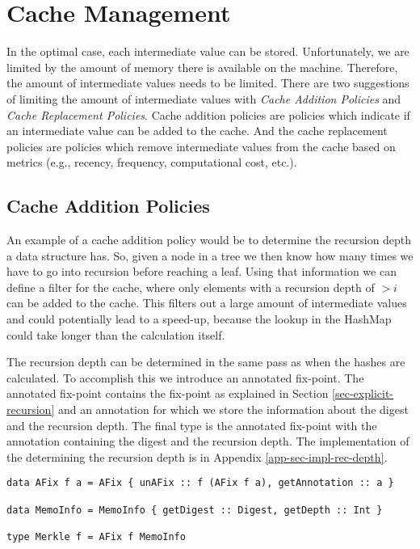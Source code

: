 \section{Cache Management}

In the optimal case, each intermediate value can be stored. Unfortunately, we are limited by the amount of memory there is available on the machine. Therefore, the amount of intermediate values needs to be limited. There are two suggestions of limiting the amount of intermediate values with \textit{Cache Addition Policies} and \textit{Cache Replacement Policies}. Cache addition policies are policies which indicate if an intermediate value can be added to the cache. And the cache replacement policies are policies which remove intermediate values from the cache based on metrics (e.g., recency, frequency, computational cost, etc.). 

\subsection{Cache Addition Policies}

An example of a cache addition policy would be to determine the recursion depth a data structure has. So, given a node in a tree we then know how many times we have to go into recursion before reaching a leaf. Using that information we can define a filter for the cache, where only elements with a recursion depth of $>i$ can be added to the cache. This filters out a large amount of intermediate values and could potentially lead to a speed-up, because the lookup in the HashMap could take longer than the calculation itself. 

The recursion depth can be determined in the same pass as when the hashes are calculated. To accomplish this we introduce an annotated fix-point. The annotated fix-point contains the fix-point as explained in Section \ref*{sec-explicit-recursion} and an annotation for which we store the information about the digest and the recursion depth. The final  type is the annotated fix-point with the annotation containing the digest and the recursion depth. The implementation of the determining the recursion depth is in Appendix \ref*{app-sec-impl-rec-depth}.

\begin{verbatim}
data AFix f a = AFix { unAFix :: f (AFix f a), getAnnotation :: a }

data MemoInfo = MemoInfo { getDigest :: Digest, getDepth :: Int }

type Merkle f = AFix f MemoInfo
\end{verbatim}

